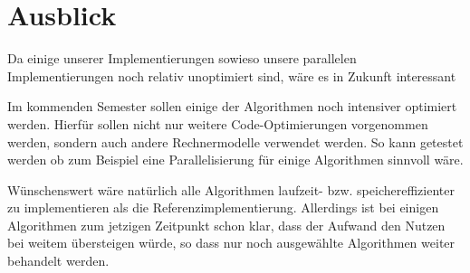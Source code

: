 \section{Ausblick}

Da einige unserer Implementierungen sowieso unsere parallelen Implementierungen noch relativ unoptimiert sind, wäre es in Zukunft interessant

Im  kommenden Semester sollen einige der Algorithmen noch intensiver optimiert werden.
Hierfür sollen nicht nur weitere Code-Optimierungen vorgenommen werden, sondern auch andere Rechnermodelle verwendet werden.
So kann getestet werden ob zum Beispiel eine Parallelisierung für einige Algorithmen sinnvoll wäre.

Wünschenswert wäre natürlich alle Algorithmen laufzeit- bzw. speichereffizienter zu implementieren als die Referenzimplementierung.
Allerdings ist bei einigen Algorithmen zum jetzigen Zeitpunkt schon klar,
dass der Aufwand den Nutzen bei weitem übersteigen würde, so dass nur noch ausgewählte Algorithmen weiter behandelt werden.